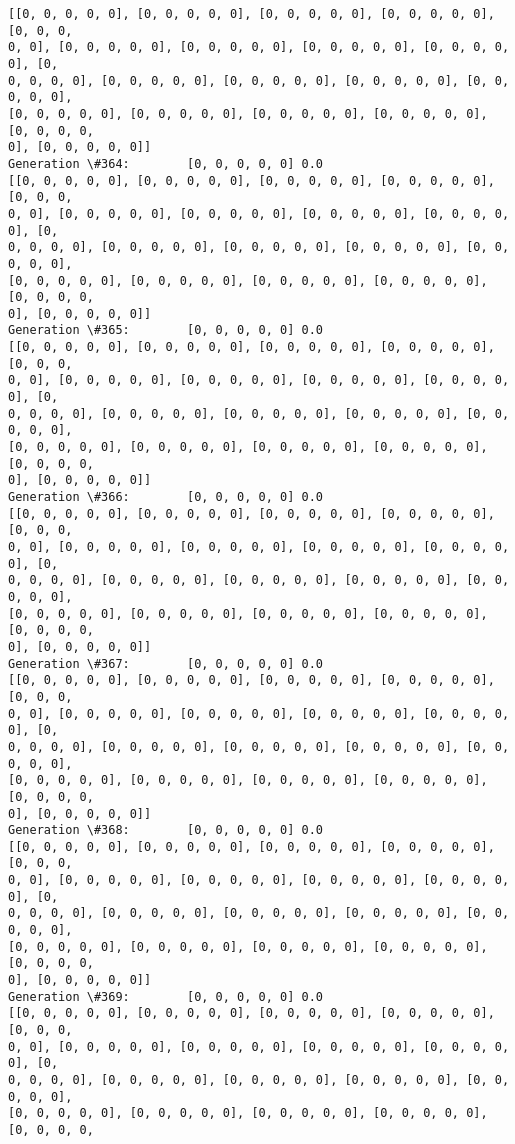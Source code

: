 \documentclass[11pt]{article}
\begin{document}
\begin{Verbatim}[commandchars=\\\{\}]
[[0, 0, 0, 0, 0], [0, 0, 0, 0, 0], [0, 0, 0, 0, 0], [0, 0, 0, 0, 0], [0, 0, 0,
0, 0], [0, 0, 0, 0, 0], [0, 0, 0, 0, 0], [0, 0, 0, 0, 0], [0, 0, 0, 0, 0], [0,
0, 0, 0, 0], [0, 0, 0, 0, 0], [0, 0, 0, 0, 0], [0, 0, 0, 0, 0], [0, 0, 0, 0, 0],
[0, 0, 0, 0, 0], [0, 0, 0, 0, 0], [0, 0, 0, 0, 0], [0, 0, 0, 0, 0], [0, 0, 0, 0,
0], [0, 0, 0, 0, 0]]
Generation \#364:        [0, 0, 0, 0, 0] 0.0
[[0, 0, 0, 0, 0], [0, 0, 0, 0, 0], [0, 0, 0, 0, 0], [0, 0, 0, 0, 0], [0, 0, 0,
0, 0], [0, 0, 0, 0, 0], [0, 0, 0, 0, 0], [0, 0, 0, 0, 0], [0, 0, 0, 0, 0], [0,
0, 0, 0, 0], [0, 0, 0, 0, 0], [0, 0, 0, 0, 0], [0, 0, 0, 0, 0], [0, 0, 0, 0, 0],
[0, 0, 0, 0, 0], [0, 0, 0, 0, 0], [0, 0, 0, 0, 0], [0, 0, 0, 0, 0], [0, 0, 0, 0,
0], [0, 0, 0, 0, 0]]
Generation \#365:        [0, 0, 0, 0, 0] 0.0
[[0, 0, 0, 0, 0], [0, 0, 0, 0, 0], [0, 0, 0, 0, 0], [0, 0, 0, 0, 0], [0, 0, 0,
0, 0], [0, 0, 0, 0, 0], [0, 0, 0, 0, 0], [0, 0, 0, 0, 0], [0, 0, 0, 0, 0], [0,
0, 0, 0, 0], [0, 0, 0, 0, 0], [0, 0, 0, 0, 0], [0, 0, 0, 0, 0], [0, 0, 0, 0, 0],
[0, 0, 0, 0, 0], [0, 0, 0, 0, 0], [0, 0, 0, 0, 0], [0, 0, 0, 0, 0], [0, 0, 0, 0,
0], [0, 0, 0, 0, 0]]
Generation \#366:        [0, 0, 0, 0, 0] 0.0
[[0, 0, 0, 0, 0], [0, 0, 0, 0, 0], [0, 0, 0, 0, 0], [0, 0, 0, 0, 0], [0, 0, 0,
0, 0], [0, 0, 0, 0, 0], [0, 0, 0, 0, 0], [0, 0, 0, 0, 0], [0, 0, 0, 0, 0], [0,
0, 0, 0, 0], [0, 0, 0, 0, 0], [0, 0, 0, 0, 0], [0, 0, 0, 0, 0], [0, 0, 0, 0, 0],
[0, 0, 0, 0, 0], [0, 0, 0, 0, 0], [0, 0, 0, 0, 0], [0, 0, 0, 0, 0], [0, 0, 0, 0,
0], [0, 0, 0, 0, 0]]
Generation \#367:        [0, 0, 0, 0, 0] 0.0
[[0, 0, 0, 0, 0], [0, 0, 0, 0, 0], [0, 0, 0, 0, 0], [0, 0, 0, 0, 0], [0, 0, 0,
0, 0], [0, 0, 0, 0, 0], [0, 0, 0, 0, 0], [0, 0, 0, 0, 0], [0, 0, 0, 0, 0], [0,
0, 0, 0, 0], [0, 0, 0, 0, 0], [0, 0, 0, 0, 0], [0, 0, 0, 0, 0], [0, 0, 0, 0, 0],
[0, 0, 0, 0, 0], [0, 0, 0, 0, 0], [0, 0, 0, 0, 0], [0, 0, 0, 0, 0], [0, 0, 0, 0,
0], [0, 0, 0, 0, 0]]
Generation \#368:        [0, 0, 0, 0, 0] 0.0
[[0, 0, 0, 0, 0], [0, 0, 0, 0, 0], [0, 0, 0, 0, 0], [0, 0, 0, 0, 0], [0, 0, 0,
0, 0], [0, 0, 0, 0, 0], [0, 0, 0, 0, 0], [0, 0, 0, 0, 0], [0, 0, 0, 0, 0], [0,
0, 0, 0, 0], [0, 0, 0, 0, 0], [0, 0, 0, 0, 0], [0, 0, 0, 0, 0], [0, 0, 0, 0, 0],
[0, 0, 0, 0, 0], [0, 0, 0, 0, 0], [0, 0, 0, 0, 0], [0, 0, 0, 0, 0], [0, 0, 0, 0,
0], [0, 0, 0, 0, 0]]
Generation \#369:        [0, 0, 0, 0, 0] 0.0
[[0, 0, 0, 0, 0], [0, 0, 0, 0, 0], [0, 0, 0, 0, 0], [0, 0, 0, 0, 0], [0, 0, 0,
0, 0], [0, 0, 0, 0, 0], [0, 0, 0, 0, 0], [0, 0, 0, 0, 0], [0, 0, 0, 0, 0], [0,
0, 0, 0, 0], [0, 0, 0, 0, 0], [0, 0, 0, 0, 0], [0, 0, 0, 0, 0], [0, 0, 0, 0, 0],
[0, 0, 0, 0, 0], [0, 0, 0, 0, 0], [0, 0, 0, 0, 0], [0, 0, 0, 0, 0], [0, 0, 0, 0,

\end{Verbatim}
\end{document}
